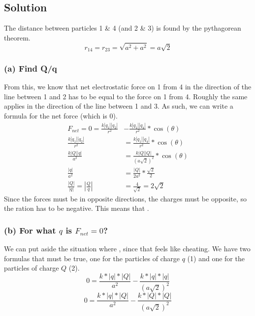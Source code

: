 \documentclass[12pt]{article}
\begin{document}
\subsection*{Solution}
The distance between particles 1 \& 4 (and 2 \& 3) is found by the pythagorean theorem.
\[r_{14} = r_{23} = \sqrt{a^2 + a^2} = a\sqrt{2}\]

\subsubsection*{(a) Find Q/q}
From this, we know that net electrostatic force on 1 from 4 in the direction of the line between 1 and 2 has to be equal to the force on 1 from 4. Roughly the same applies in the direction of the line between 1 and 3. As such, we can write a formula for the net force (which is 0).
\begin{align*}
    F_{net} = 0 = \frac{k\left|q_1\right|\left|q_2\right|}{r^2} &- \frac{k\left|q_1\right|\left|q_4\right|}{r^2}*\cos(\theta)\\
    \frac{k\left|q_1\right|\left|q_2\right|}{r^2} &= \frac{k\left|q_1\right|\left|q_4\right|}{r^2}*\cos(\theta)\\
    \frac{k\left|Q\right|\left|q\right|}{a^2} &= \frac{k\left|Q\right|\left|Q\right|}{(a\sqrt{2})^2}*\cos(\theta)\\
    \frac{\left|q\right|}{a^2} &= \frac{\left|Q\right|}{2a^2}*\frac{\sqrt{2}}{2}\\
    \frac{\left|Q\right|}{\left|q\right|} = \left|\frac{Q}{q}\right| &= \frac{4}{\sqrt{2}} = 2\sqrt{2}
\end{align*}
Since the forces must be in opposite directions, the charges must be opposite, so the ration has to be negative. This means that .

\pagebreak
\subsubsection*{(b) For what $q$ is $F_{net} = 0$?}
We can put aside the situation where , since that feels like cheating. We have two formulas that must be true, one for the particles of charge $q$ (1) and one for the particles of charge $Q$ (2). 
\begin{equation}
    0 = \frac{k*|q|*|Q|}{a^2} - \frac{k*|q|*|q|}{(a\sqrt{2})^2}
\end{equation}
\begin{equation}
    0 = \frac{k*|q|*|Q|}{a^2} - \frac{k*|Q|*|Q|}{(a\sqrt{2})^2}
\end{equation}
\end{document}
